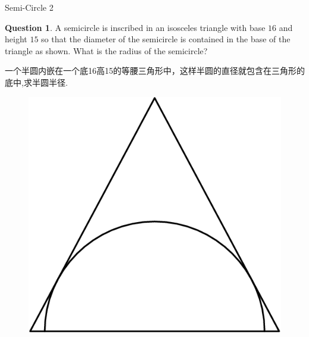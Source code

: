 \documentclass{beamer}
\theoremstyle{definition}
\newtheorem{ques}[defn]{Question}
\begin{document}
\begin{frame}{Semi-Circle 2}
    \begin{ques}
        A semicircle is inscribed in an isosceles triangle with base $16$ and height $15$ so that the diameter of the semicircle is contained in the base of the triangle as shown. What is the radius of the semicircle?

        一个半圆内嵌在一个底16高15的等腰三角形中，这样半圆的直径就包含在三角形的底中,求半圆半径.
    \end{ques}
    \begin{figure}
        \includegraphics[height=0.4\textheight]{circle1.png}
    \end{figure}
\end{frame}
\end{document}
